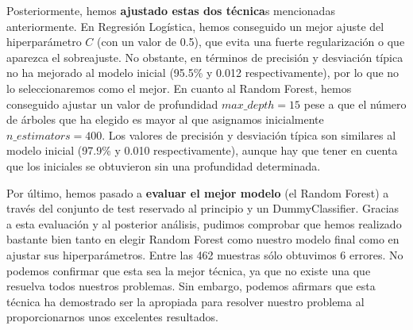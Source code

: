 \documentclass[11pt,a4paper]{article}
\begin{document}
Posteriormente, hemos \textbf{ajustado estas dos técnica}s mencionadas anteriormente. En Regresión Logística, hemos conseguido un mejor ajuste del
hiperparámetro $C$ (con un valor de 0.5), que evita una fuerte regularización o que aparezca el sobreajuste. No obstante, en términos de
precisión y desviación típica no ha mejorado al modelo inicial (95.5\% y 0.012 respectivamente), por lo que no lo seleccionaremos como el
mejor. En cuanto al Random Forest, hemos conseguido ajustar un valor de profundidad $max\_depth = 15$ pese a que el número de árboles que
ha elegido es mayor al que asignamos inicialmente $n\_estimators = 400$. Los valores de precisión y desviación típica son similares al
modelo inicial (97.9\% y 0.010 respectivamente), aunque hay que tener en cuenta que los iniciales se obtuvieron sin una profundidad
determinada.

Por último, hemos pasado a \textbf{evaluar el mejor modelo} (el Random Forest) a través del conjunto de test reservado
al principio y un DummyClassifier. Gracias a esta evaluación y al posterior análisis, pudimos comprobar que hemos realizado bastante
bien tanto en elegir Random Forest como nuestro modelo final como en ajustar sus hiperparámetros.
Entre las 462 muestras sólo obtuvimos 6 errores. No podemos confirmar que esta sea la mejor técnica, ya que no existe una que resuelva
todos nuestros problemas. Sin embargo, podemos afirmars que esta técnica ha demostrado ser la apropiada para resolver nuestro problema
al proporcionarnos unos excelentes resultados.

\newpage
\end{document}
